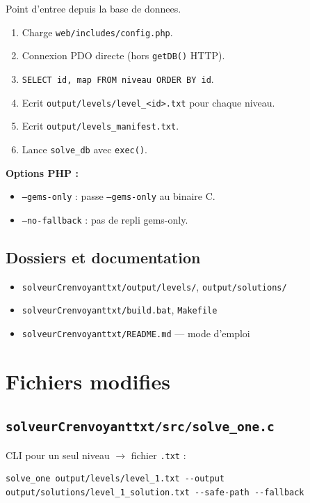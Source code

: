 \documentclass[11pt,a4paper]{article}
\begin{document}
Point d'entree depuis la base de donnees.

\begin{enumerate}
    \item Charge \texttt{web/includes/config.php}.
    \item Connexion PDO directe (hors \texttt{getDB()} HTTP).
    \item \texttt{SELECT id, map FROM niveau ORDER BY id}.
    \item Ecrit \texttt{output/levels/level\_<id>.txt} pour chaque niveau.
    \item Ecrit \texttt{output/levels\_manifest.txt}.
    \item Lance \texttt{solve\_db} avec \texttt{exec()}.
\end{enumerate}

\textbf{Options PHP :}
\begin{itemize}
    \item \texttt{--gems-only} : passe \texttt{--gems-only} au binaire C.
    \item \texttt{--no-fallback} : pas de repli gems-only.
\end{itemize}

\subsection{Dossiers et documentation}

\begin{itemize}
    \item \texttt{solveurCrenvoyanttxt/output/levels/}, \texttt{output/solutions/}
    \item \texttt{solveurCrenvoyanttxt/build.bat}, \texttt{Makefile}
    \item \texttt{solveurCrenvoyanttxt/README.md} --- mode d'emploi
\end{itemize}

\section{Fichiers modifies}

\subsection{\texttt{solveurCrenvoyanttxt/src/solve\_one.c}}

CLI pour un seul niveau $\rightarrow$ fichier \texttt{.txt} :
\begin{lstlisting}[style=kllisting]
solve_one output/levels/level_1.txt --output output/solutions/level_1_solution.txt --safe-path --fallback
\end{lstlisting}
\end{document}
